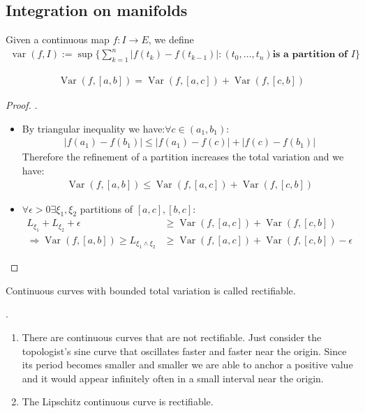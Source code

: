 \subsection{Integration on manifolds}
\begin{definition}
	Given a continuous map $f : I \rightarrow E$, we define
	\begin{align*}
		\operatorname{var}(f, I):= \sup \{ \sum_{k = 1}^n |f(t_k) - f(t_{k-1})|: (t_0, \dots, t_n) \textbf{is a partition of } I \}
	\end{align*}
\end{definition}

\begin{lemma}
	\begin{align*}
		\operatorname{Var}(f, [a, b]) = \operatorname{Var}(f, [a, c]) + \operatorname{Var}(f, [c, b])
	\end{align*}
\end{lemma}
\begin{proof}.
	\begin{itemize}
		\item By triangular inequality we have:$ \forall c \in (a_1, b_1)$:
		\begin{align*}
			|f(a_1) - f(b_1)| \leq |f(a_1) - f(c)| + |f(c) - f(b_1)|
		\end{align*}
		Therefore the refinement of a partition increases the total variation and we have:
		\begin{align*}
			\operatorname{Var}(f, [a, b]) \leq \operatorname{Var}(f, [a, c]) + \operatorname{Var}(f, [c, b])
		\end{align*}
		
		\item $\forall \epsilon > 0 \exists \xi_1, \xi_2$ partitions of $[a, c], [b, c]$: 
		\begin{align*}
			L_{\xi_1} + L_{\xi_2} + \epsilon &\geq \operatorname{Var}(f, [a, c]) + \operatorname{Var}(f, [c, b])\\
		\Rightarrow	
		\operatorname{Var}(f, [a, b]) \geq L_{\xi_1 \wedge \xi_2}  &\geq \operatorname{Var}(f, [a, c]) + \operatorname{Var}(f, [c, b])-\epsilon
		\end{align*} 
	\end{itemize}
\end{proof}

\begin{definition}
	Continuous curves with bounded total variation is called rectifiable.
\end{definition}
\begin{remark}.
\begin{enumerate}
	\item There are continuous curves that are not rectifiable. Just consider the topologist's sine curve that oscillates faster and faster near the origin. Since its period becomes smaller and smaller we are able to anchor a positive value and it would appear infinitely often in a small interval near the origin.
	\item The Lipschitz continuous curve is rectifiable.
\end{enumerate}	
\end{remark}

